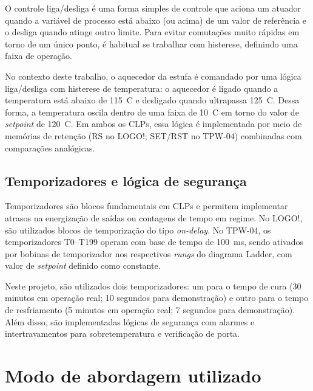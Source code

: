 \documentclass[
  12pt,
  openright,
  oneside,
  a4paper,
  chapter=TITLE,
  section=TITLE,
  brazilian
]{abntex2}
\begin{document}
O controle liga/desliga \'{e} uma forma simples de controle que aciona um atuador quando a vari\'{a}vel de processo est\'{a} abaixo (ou acima) de um valor de refer\^{e}ncia e o desliga quando atinge outro limite. Para evitar comuta\c{c}\~{o}es muito r\'{a}pidas em torno de um \'{u}nico ponto, \'{e} habitual se trabalhar com histerese, definindo uma faixa de opera\c{c}\~{a}o.

No contexto deste trabalho, o aquecedor da estufa \'{e} comandado por uma l\'{o}gica liga/desliga com histerese de temperatura: o aquecedor \'{e} ligado quando a temperatura est\'{a} abaixo de 115~\textdegree{}C e desligado quando ultrapassa 125~\textdegree{}C. Dessa forma, a temperatura oscila dentro de uma faixa de 10~\textdegree{}C em torno do valor de \textit{setpoint} de 120~\textdegree{}C. Em ambos os CLPs, essa l\'{o}gica \'{e} implementada por meio de mem\'{o}rias de reten\c{c}\~{a}o (RS no LOGO!; SET/RST no TPW-04) combinadas com compara\c{c}\~{o}es anal\'{o}gicas.

\section{Temporizadores e l\'{o}gica de seguran\c{c}a}

Temporizadores s\~{a}o blocos fundamentais em CLPs e permitem implementar atrasos na energiza\c{c}\~{a}o de sa\'{i}das ou contagens de tempo em regime. No LOGO!, s\~{a}o utilizados blocos de temporiza\c{c}\~{a}o do tipo \textit{on-delay}. No TPW-04, os temporizadores T0--T199 operam com base de tempo de 100~ms, sendo ativados por bobinas de temporizador nos respectivos \textit{rungs} do diagrama Ladder, com valor de \textit{setpoint} definido como constante.

Neste projeto, s\~{a}o utilizados dois temporizadores: um para o tempo de cura (30 minutos em opera\c{c}\~{a}o real; 10 segundos para demonstra\c{c}\~{a}o) e outro para o tempo de resfriamento (5 minutos em opera\c{c}\~{a}o real; 7 segundos para demonstra\c{c}\~{a}o). Al\'{e}m disso, s\~{a}o implementadas l\'{o}gicas de seguran\c{c}a com alarmes e intertravamentos para sobretemperatura e verifica\c{c}\~{a}o de porta.

\chapter{Modo de abordagem utilizado}
\end{document}
